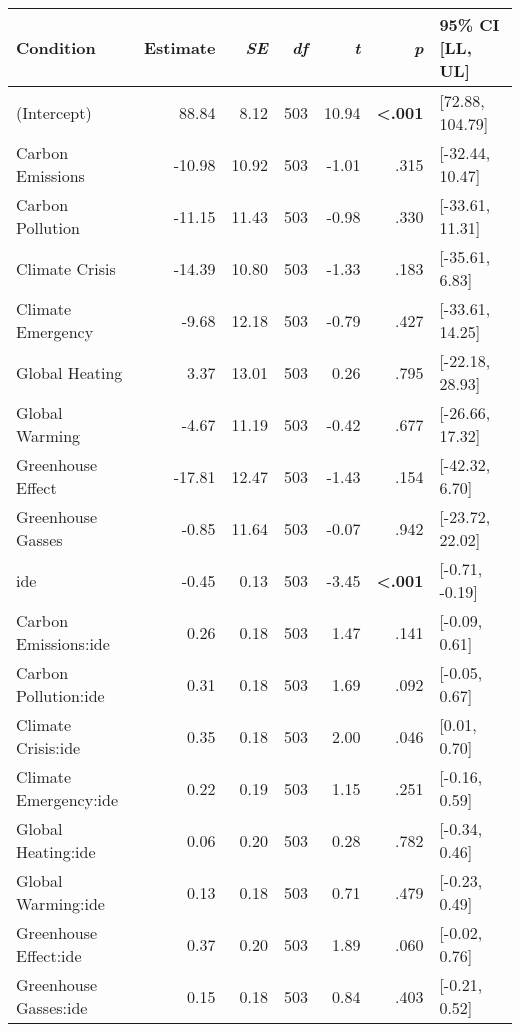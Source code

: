 \begin{table}[ht]
\centering
\begin{tabular}{lrrrrrl}
  \hline
Condition & Estimate & \textit{SE} & \textit{df} & \textit{t} & \textit{p} & 95\% CI [LL, UL] \\ 
  \hline
(Intercept) & 88.84 & 8.12 & 503 & 10.94 & \textbf{\textless  .001} & [72.88, 104.79] \\ 
  Carbon Emissions & -10.98 & 10.92 & 503 & -1.01 & .315 & [-32.44, 10.47] \\ 
  Carbon Pollution & -11.15 & 11.43 & 503 & -0.98 & .330 & [-33.61, 11.31] \\ 
  Climate Crisis & -14.39 & 10.80 & 503 & -1.33 & .183 & [-35.61, 6.83] \\ 
  Climate Emergency & -9.68 & 12.18 & 503 & -0.79 & .427 & [-33.61, 14.25] \\ 
  Global Heating & 3.37 & 13.01 & 503 & 0.26 & .795 & [-22.18, 28.93] \\ 
  Global Warming & -4.67 & 11.19 & 503 & -0.42 & .677 & [-26.66, 17.32] \\ 
  Greenhouse Effect & -17.81 & 12.47 & 503 & -1.43 & .154 & [-42.32, 6.70] \\ 
  Greenhouse Gasses & -0.85 & 11.64 & 503 & -0.07 & .942 & [-23.72, 22.02] \\ 
  ide & -0.45 & 0.13 & 503 & -3.45 & \textbf{\textless  .001} & [-0.71, -0.19] \\ 
  Carbon Emissions:ide & 0.26 & 0.18 & 503 & 1.47 & .141 & [-0.09, 0.61] \\ 
  Carbon Pollution:ide & 0.31 & 0.18 & 503 & 1.69 & .092 & [-0.05, 0.67] \\ 
  Climate Crisis:ide & 0.35 & 0.18 & 503 & 2.00 & .046 & [0.01, 0.70] \\ 
  Climate Emergency:ide & 0.22 & 0.19 & 503 & 1.15 & .251 & [-0.16, 0.59] \\ 
  Global Heating:ide & 0.06 & 0.20 & 503 & 0.28 & .782 & [-0.34, 0.46] \\ 
  Global Warming:ide & 0.13 & 0.18 & 503 & 0.71 & .479 & [-0.23, 0.49] \\ 
  Greenhouse Effect:ide & 0.37 & 0.20 & 503 & 1.89 & .060 & [-0.02, 0.76] \\ 
  Greenhouse Gasses:ide & 0.15 & 0.18 & 503 & 0.84 & .403 & [-0.21, 0.52] \\ 
   \hline
\end{tabular}
\end{table}
